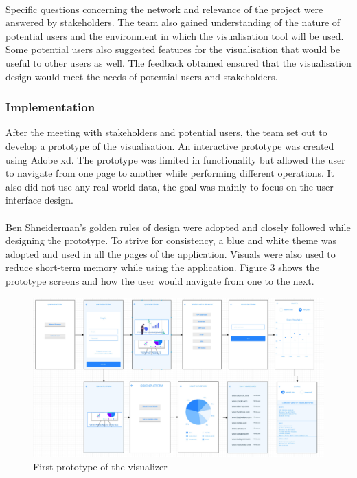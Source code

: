 \paragraph{}
Specific questions concerning the network and relevance of the project were answered by stakeholders. The team also gained understanding of the nature of potential users and the environment in which the visualisation tool will be used. Some potential users also suggested features for the visualisation that would be useful to other users as well. The feedback obtained ensured that the visualisation design would meet the needs of potential users and stakeholders.

\subsubsection{Implementation}
After the meeting with stakeholders and potential users, the team set out to develop a prototype of the visualisation. An interactive prototype was created using Adobe xd. The prototype was limited in functionality but allowed the user to navigate from one page to another while performing different operations. It also did not use any real world data, the goal was mainly to focus on the user interface design.
\paragraph{}
Ben Shneiderman's golden rules of design were adopted and closely followed while designing the prototype. To strive for consistency, a blue and white theme was adopted and used in all the pages of the application. Visuals were also used to reduce short-term memory while using the application. Figure 3 shows the prototype screens and how the user would navigate from one to the next.


\begin{figure}
	\centering
	\includegraphics[width=1\linewidth]{images/proto}
	\caption{First prototype of the visualizer}
	\label{fig:proto}
\end{figure}

